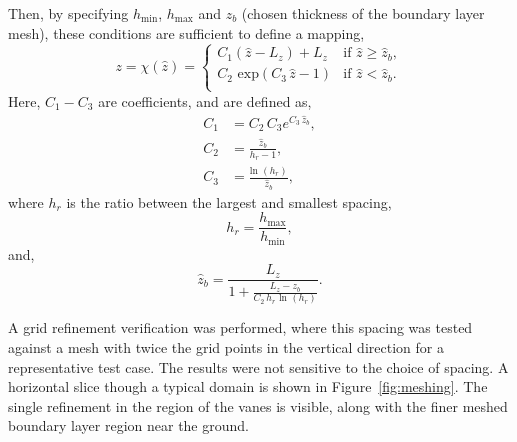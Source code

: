 %
%
Then, by specifying $h_{\text{min}}$, $h_{\text{max}}$ and 
$z_b$ (chosen thickness of the boundary layer mesh), 
these conditions are sufficient to define a mapping, 
\begin{equation}
 z = \chi(\hat z) = 
 \begin{cases} C_1 (\hat z - L_z) + L_z & \text{if } \hat z \geq \hat z_b, \\
   C_2 \text{ exp}(C_3 \, \hat z - 1)      & \text{if } \hat z < \hat z_b. \\
 \end{cases}
\end{equation}
%
Here, $C_1-C_3$ are coefficients, and are defined as, %
\begin{align}
  C_1 &= C_2 \, C_3 e^{C_3 \, \hat z_b}, \\
  C_2 &= \frac{\hat z_b}{h_r -1}, \\
  C_3 &= \frac{\text{ln }(h_r) }{\hat z_b},
\end{align}
where $h_r$ is the ratio between the largest and smallest spacing, 
\begin{equation}
  h_r = \frac{h_{\text{max}}}{h_{\text{min}}}, 
\end{equation}
and,
\begin{equation}
  \hat z_b = \frac{L_z}{1 + \frac{L_z - z_b}{C_2 \, h_r \text{ ln }(h_r)}}.
\end{equation}


A grid refinement verification was performed, where this spacing was 
tested against a mesh with twice the grid points in the vertical
direction for a representative test case. The results were not sensitive
to the choice of spacing. A horizontal slice though a
typical domain is shown in Figure~\ref{fig:meshing}. The single 
refinement in the region of the vanes is visible, along with the finer 
meshed boundary layer region near the ground. 

